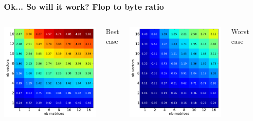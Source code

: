 \documentclass{beamer}
\begin{document}
\begin{frame}
  \frametitle{Ok... So will it work? Flop to byte ratio}

  \begin{columns}
    \includegraphics[width=\linewidth]{slides-figures/ICS-figures/flops_to_bytes_best-crop.pdf}

    \begin{center}
      Best case\\~
    \end{center}

    \includegraphics[width=\linewidth]{slides-figures/ICS-figures/flops_to_bytes_worst-crop.pdf}
    \begin{center}
      Worst case\\~
    \end{center}


\end{columns}
\end{frame}
\end{document}
